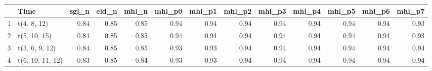\begin{table}[ht]
\centering
\begin{tabular}{rlrrrrrrrrrrr}
  \hline
 & Time & sgl\_n & eld\_n & mhl\_n & mhl\_p0 & mhl\_p1 & mhl\_p2 & mhl\_p3 & mhl\_p4 & mhl\_p5 & mhl\_p6 & mhl\_p7 \\ 
  \hline
1 & t(4, 8, 12) & 0.84 & 0.85 & 0.85 & 0.94 & 0.94 & 0.94 & 0.94 & 0.94 & 0.94 & 0.94 & 0.93 \\ 
  2 & t(5, 10, 15) & 0.84 & 0.85 & 0.85 & 0.94 & 0.94 & 0.94 & 0.94 & 0.94 & 0.94 & 0.94 & 0.93 \\ 
  3 & t(3, 6, 9, 12) & 0.84 & 0.85 & 0.85 & 0.93 & 0.93 & 0.94 & 0.94 & 0.94 & 0.94 & 0.94 & 0.94 \\ 
  4 & t(6, 10, 11, 12) & 0.83 & 0.85 & 0.84 & 0.93 & 0.93 & 0.94 & 0.94 & 0.94 & 0.94 & 0.94 & 0.94 \\ 
   \hline
\end{tabular}
\end{table}
